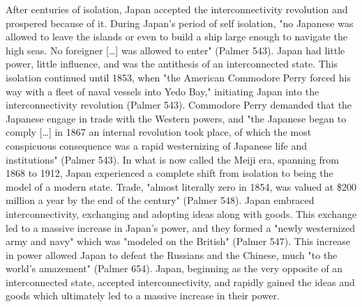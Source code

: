\documentclass[letterpaper]{article}
\begin{document}
After centuries of isolation, Japan accepted the interconnectivity
revolution and prospered because of it. During Japan's period of self
isolation, "no Japanese was allowed to leave the islands or even to
build a ship large enough to navigate the high seas. No foreigner [\ldots{}]
was allowed to enter" (Palmer 543). Japan had little power, little
influence, and was the antithesis of an interconnected state. This
isolation continued until 1853, when "the American Commodore Perry
forced his way with a fleet of naval vessels into Yedo Bay," initiating
Japan into the interconnectivity revolution (Palmer 543). Commodore
Perry demanded that the Japanese engage in trade with the Western
powers, and "the Japanese began to comply [\ldots{}] in 1867 an internal
revolution took place, of which the most conspicuous consequence was a
rapid westernizing of Japanese life and institutions" (Palmer 543). In
what is now called the Meiji era, spanning from 1868 to 1912, Japan
experienced a complete shift from isolation to being the model of a
modern state. Trade, "almost literally zero in 1854, was valued at \$200
million a year by the end of the century" (Palmer 548). Japan embraced
interconnectivity, exchanging and adopting ideas along with goods. This
exchange led to a massive increase in Japan's power, and they formed a
"newly westernized army and navy" which was "modeled on the British"
(Palmer 547). This increase in power allowed Japan to defeat the
Russians and the Chinese, much "to the world's amazement" (Palmer 654).
Japan, beginning as the very opposite of an interconnected state,
accepted interconnectivity, and rapidly gained the ideas and goods which
ultimately led to a massive increase in their power.
\end{document}
